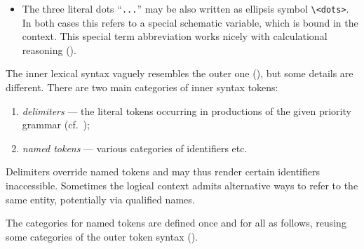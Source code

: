 \begin{isabellebody}
\begin{isamarkuptext}
\begin{itemize}
\begin{description}
  \end{description}

  \item The three literal dots ``\verb|...|'' may be also
  written as ellipsis symbol \verb|\<dots>|.  In both cases this
  refers to a special schematic variable, which is bound in the
  context.  This special term abbreviation works nicely with
  calculational reasoning ().

  \end{itemize}%
\end{isamarkuptext}%
\isamarkuptrue%
%
\isamarkuptrue%
%
\begin{isamarkuptext}%
The inner lexical syntax vaguely resembles the outer one
  (), but some details are different.  There are
  two main categories of inner syntax tokens:

  \begin{enumerate}

  \item \emph{delimiters} --- the literal tokens occurring in
  productions of the given priority grammar (cf.\
  );

  \item \emph{named tokens} --- various categories of identifiers etc.

  \end{enumerate}

  Delimiters override named tokens and may thus render certain
  identifiers inaccessible.  Sometimes the logical context admits
  alternative ways to refer to the same entity, potentially via
  qualified names.

  \medskip The categories for named tokens are defined once and for
  all as follows, reusing some categories of the outer token syntax
  (\secref{sec:outer-lex}).


\end{isamarkuptext}
\end{isabellebody}
